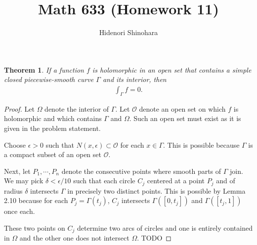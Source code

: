 \documentclass[12pt, psamsfonts]{amsart}
\newtheorem{thm}{Theorem}[section]
\theoremstyle{definition}
\theoremstyle{remark}
\numberwithin{equation}{section}
\begin{document}
\title{Math 633 (Homework 11)}
\author{Hidenori Shinohara}
\maketitle

\begin{thm}
  If a function $f$ is holomorphic in an open set that contains a simple closed piecewise-smooth curve $\Gamma$ and its interior, then
  \begin{align*}
    \int_{\Gamma} f = 0.
  \end{align*}
\end{thm}

\begin{proof}
  Let $\Omega$ denote the interior of $\Gamma$.
  Let $\mathcal{O}$ denote an open set on which $f$ is holomorphic and which contains $\Gamma$ and $\Omega$.
  Such an open set must exist as it is given in the problem statement.

  Choose $\epsilon > 0$ such that $N(x, \epsilon) \subset \mathcal{O}$ for each $x \in \Gamma$.
  This is possible because $\Gamma$ is a compact subset of an open set $\mathcal{O}$.

  Next, let $P_1, \cdots, P_n$ denote the consecutive points where smooth parts of $\Gamma$ join.
  We may pick $\delta < \epsilon / 10$ such that each circle $C_j$ centered at a point $P_j$ and of radius $\delta$ intersects $\Gamma$ in precisely two distinct points.
  This is possible by Lemma 2.10 because for each $P_j = \Gamma(t_j)$, $C_j$ intersects $\Gamma([0, t_j])$ and $\Gamma([t_j, 1])$ once each.

  These two points on $C_j$ determine two arcs of circles and one is entirely contained in $\Omega$ and the other one does not intersect $\Omega$.
  TODO

\end{proof}
\end{document}
